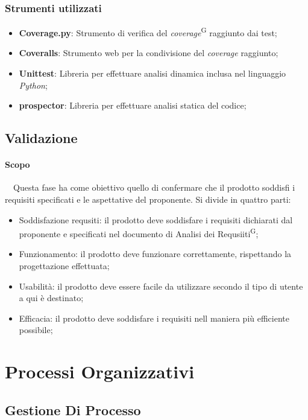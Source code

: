 \documentclass[5pt]{article}
\begin{document}
   \subsubsection{Strumenti utilizzati}
   \begin{itemize}
   	\item \textbf{Coverage.py}: Strumento di verifica del \textit{coverage}\textsuperscript{G} raggiunto dai test;
   	\item \textbf{Coveralls}: Strumento web per la condivisione del \textit{coverage} raggiunto;
   	\item \textbf{Unittest}: Libreria per effettuare analisi dinamica inclusa nel linguaggio \textit{Python};
   	\item \textbf{prospector}: Libreria per effettuare analisi statica del codice;
   	
    \end{itemize}
	
	\subsection{Validazione}
   
   \paragraph{Scopo}~\
   Questa fase ha come obiettivo quello di confermare che il prodotto soddisfi i requisiti specificati e le aspettative del proponente.
	Si divide in quattro parti:
	\begin{itemize}
		\item Soddisfazione requsiti: il prodotto deve soddisfare i requisiti dichiarati dal proponente e specificati nel documento di Analisi dei Requsiiti\textsuperscript{G};
		\item Funzionamento: il prodotto deve funzionare correttamente, rispettando la progettazione effettuata;
		\item Usabilità: il prodotto deve essere facile da utilizzare secondo il tipo di utente a qui è destinato;
		\item Efficacia: il prodotto deve soddisfare i requisiti nell maniera più efficiente possibile; 
	\end{itemize}

\section{Processi Organizzativi}
\subsection{Gestione Di Processo}
\end{document}
